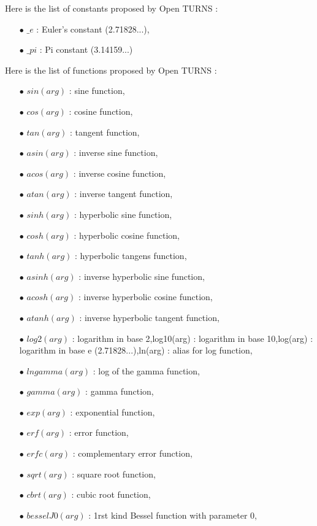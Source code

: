Here is the list of constants proposed by Open TURNS :
\begin{itemize}
\item[$\bullet$] $\_e$ :  Euler's constant (2.71828...),
\item[$\bullet$] $\_pi$ : Pi constant (3.14159...)
\end{itemize}

Here is the list of functions proposed by Open TURNS :
\begin{itemize}
\item[$\bullet$] $sin(arg)$  :  sine function,
\item[$\bullet$] $cos(arg)$  :  cosine function,
\item[$\bullet$] $tan(arg)$  :  tangent function,
\item[$\bullet$] $asin(arg)$  :  inverse sine function,
\item[$\bullet$] $acos(arg)$  :  inverse cosine function,
\item[$\bullet$] $atan(arg)$  :  inverse tangent function,
\item[$\bullet$] $sinh(arg)$  :  hyperbolic sine function,
\item[$\bullet$] $cosh(arg)$  :  hyperbolic cosine function,
\item[$\bullet$] $tanh(arg)$  :  hyperbolic tangens function,
\item[$\bullet$] $asinh(arg)$  :  inverse hyperbolic sine function,
\item[$\bullet$] $acosh(arg)$  :  inverse hyperbolic cosine function,
\item[$\bullet$] $atanh(arg)$  :  inverse hyperbolic tangent function,
\item[$\bullet$] $log2(arg)$  :  logarithm in base 2,log10(arg)  :  logarithm in base 10,log(arg)  :  logarithm in base e (2.71828...),ln(arg)  :  alias for log function,
\item[$\bullet$] $lngamma(arg)$  :  log of the gamma function,
\item[$\bullet$] $gamma(arg)$  :  gamma function,
\item[$\bullet$] $exp(arg)$  :  exponential function,
\item[$\bullet$] $erf(arg)$  :  error function,
\item[$\bullet$] $erfc(arg)$  :  complementary error function,
\item[$\bullet$] $sqrt(arg)$  :  square root function,
\item[$\bullet$] $cbrt(arg)$  :  cubic root function,
\item[$\bullet$] $besselJ0(arg)$  :  1rst kind Bessel function with parameter 0,

\end{itemize}
